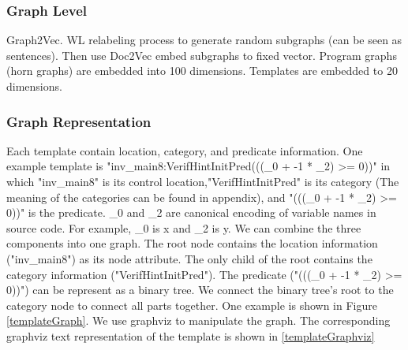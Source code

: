 \documentclass{article}
\begin{document}
\subsubsection{Graph Level}
Graph2Vec\cite{DBLP:journals/corr/NarayananCVCLJ17}.
WL relabeling process \cite{WL_relabeling_process} to generate random subgraphs (can be seen as sentences). Then use Doc2Vec embed subgraphs to fixed vector.
Program graphs (horn graphs) are embedded into 100 dimensions. Templates are embedded to 20 dimensions.
\subsubsection{Graph Representation}

Each template contain location, category, and predicate information. One example template is "inv\_main8:VerifHintInitPred(((\_0 + -1 * \_2) >= 0))" in which "inv\_main8" is its control location,"VerifHintInitPred" is its category (The meaning of the categories can be found in appendix), and "(((\_0 + -1 * \_2) >= 0))" is the predicate. \_0 and \_2 are canonical encoding of variable names in source code. For example, \_0 is x and \_2 is y.  We can combine the three components into one graph. The root node contains the location information ("inv\_main8") as its node attribute. The only child of the root contains the category information ("VerifHintInitPred"). The predicate ("(((\_0 + -1 * \_2) >= 0))") can be represent as a binary tree. We connect the binary tree's root to the category node to connect all parts together. One example is shown in Figure \ref{templateGraph}. We use graphviz to manipulate the graph. The corresponding graphviz text representation of the template is shown in \ref{templateGraphviz}
\end{document}
